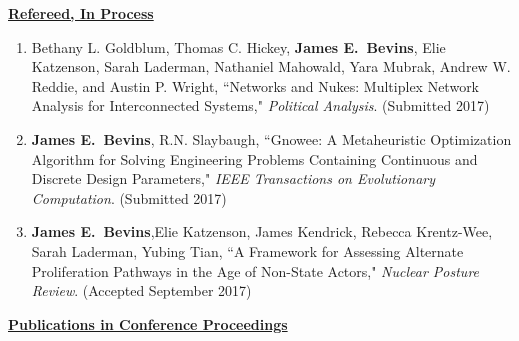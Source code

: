 \underline{\textbf{Refereed, In Process}}

\begin{enumerate}
  
  \item Bethany L. Goldblum, Thomas C. Hickey, \textbf{James E.\ Bevins}, Elie Katzenson, Sarah Laderman, Nathaniel Mahowald, Yara Mubrak, Andrew W. Reddie, and Austin P. Wright, ``Networks and Nukes: Multiplex Network Analysis for Interconnected Systems," \textit{Political Analysis}. (Submitted 2017)

  \item \textbf{James E.\ Bevins}, R.N. Slaybaugh, ``Gnowee: A Metaheuristic Optimization Algorithm for Solving Engineering Problems Containing Continuous and Discrete Design Parameters," \textit{IEEE Transactions on Evolutionary Computation}. (Submitted 2017)
  
  \item \textbf{James E.\ Bevins},Elie Katzenson, James Kendrick, Rebecca Krentz-Wee, Sarah Laderman, Yubing Tian, ``A Framework for Assessing Alternate Proliferation Pathways in the Age of Non-State Actors," \textit{Nuclear Posture Review}. (Accepted September 2017)
\end{enumerate}


\underline{\textbf{Publications in Conference Proceedings}}

